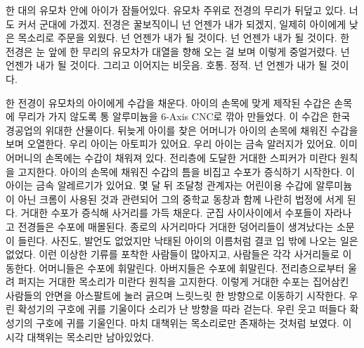 \documentclass[12pt, b6paper, openany]{memoir}
\newenvironment{lyric}{%
	\setlength{\parindent}{0pt}
}{}
\begin{document}
\begin{lyric}
한 대의 유모차 안에 아이가 잠들어있다. 유모차 주위로 전경의 무리가 뒤덮고 있다. 너도 커서 군대에 가겠지. 전경은 꿀보직이니 넌 언젠가 내가 되겠지, 일제히 아이에게 낮은 목소리로 주문을 외웠다. 넌 언젠가 내가 될 것이다. 넌 언젠가 내가 될 것이다. 한 전경은 눈 앞에 한 무리의 유모차가 대열을 향해 오는 걸 보며 이렇게 중얼거렸다. 넌 언젠가 내가 될 것이다. 그리고 이어지는 비웃음. 호통. 정적. 넌 언젠가 내가 될 것이다.



한 전경이 유모차의 아이에게 수갑을 채운다. 아이의 손목에 맞게 제작된 수갑은 손목에 무리가 가지 않도록 통 알루미늄을 6-Axis CNC로 깎아 만들었다. 이 수갑은 한국 경공업의 위대한 산물이다. 뒤늦게 아이를 찾은 어머니가 아이의 손목에 채워진 수갑을 보며 오열한다. 우리 아이는 아토피가 있어요. 우리 아이는 금속 알러지가 있어요. 이미 어머니의 손목에는 수갑이 채워져 있다. 전리층에 도달한 거대한 스피커가 미란다 원칙을 고지한다. 아이의 손목에 채워진 수갑의 틈을 비집고 수포가 증식하기 시작한다. 이 아이는 금속 알레르기가 있어요. 몇 달 뒤 조달청 관계자는 어린이용 수갑에 알루미늄이 아닌 크롬이 사용된 것과 관련되어 그의 중학교 동창과 함께 나란히 법정에 서게 된다. 거대한 수포가 증식해 사거리를 가득 채운다. 군집 사이사이에서 수포들이 자라나고 전경들은 수포에 매몰된다. 종로의 사거리마다 거대한 덩어리들이 생겨났다는 소문이 들린다. 사진도, 발언도 없었지만 낙태된 아이의 이름처럼 결코 입 밖에 나오는 일은 없었다. 이런 이상한 기류를 포착한 사람들이 많아지고, 사람들은 각각 사거리들로 이동한다. 어머니들은 수포에 휘말린다. 아버지들은 수포에 휘말린다. 전리층으로부터 울려 퍼지는 거대한 목소리가 미란다 원칙을 고지한다. 이렇게 거대한 수포는 집어삼킨 사람들의 안면을 아스팔트에 눌러 긁으며 느릿느릿 한 방향으로 이동하기 시작한다. 우린 확성기의 구호에 귀를 기울이다 소리가 난 방향을 따라 걷는다. 우린 웃고 떠들다 확성기의 구호에 귀를 기울인다. 마치 대책위는 목소리로만 존재하는 것처럼 보였다. 이 시각 대책위는 목소리만 남아있었다.


\end{lyric}
\end{document}
